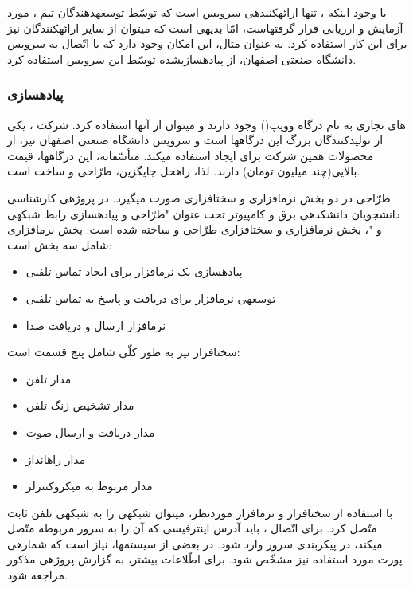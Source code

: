 با وجود اینکه ، تنها ارائه\nf کننده\nf ی سرویس  است که توسّط توسعه\nf دهندگان تیم ، مورد آزمایش و ارزیابی قرار گرفته\nf است، امّا بدیهی است که می\nf توان از سایر ارائه\nf کنندگان نیز برای این کار استفاده کرد. به عنوان مثال، این امکان وجود دارد که با اتّصال  به سرویس  دانشگاه صنعتی اصفهان، از  پیاده\nf سازی\nf شده توسّط این سرویس استفاده کرد.

\subsubsection{پیادهسازی } 
های تجاری به نام درگاه وویپ() وجود دارند و می\nf توان از آن\nf ها استفاده کرد. شرکت ، یکی از تولیدکنندگان بزرگ این درگاه\nf ها است و سرویس   دانشگاه صنعتی اصفهان نیز، از محصولات همین شرکت برای ایجاد  استفاده می\nf کند. متأسّفانه، این درگاه\nf ها، قیمت بالایی(چند میلیون تومان) دارند. لذا، راه\nf حل جایگزین، طرّاحی و ساخت  است.  

طرّاحی  در دو بخش نرم\nf افزاری و سخت\nf افزاری صورت می\nf گیرد. در پروژه\nf ی کارشناسی دانشجویان دانشکده\nf ی برق و کامپیوتر تحت عنوان "طرّاحی و پیاده\nf سازی رابط شبکه\nf ی  و "، بخش نرم\nf افزاری و سخت\nf افزاری  طرّاحی و ساخته شده است. بخش نرم\nf افزاری شامل سه بخش است:
\begin{itemize}
\item پیاده\nf سازی یک نرم\nf افزار برای ایجاد تماس تلفنی
\item توسعه\nf ی نرم\nf افزار برای دریافت و پاسخ به تماس تلفنی
\item نرم\nf افزار ارسال و دریافت صدا
\end{itemize}
 سخت\nf افزار  نیز به طور کلّی شامل پنج قسمت است:
 \begin{itemize}
 \item مدار   تلفن
 \item مدار تشخیص زنگ تلفن
 \item مدار دریافت و ارسال صوت
 \item مدار راه\nf انداز 
 \item مدار مربوط به میکروکنترلر
 \end{itemize}
 با استفاده از سخت\nf افزار و نرم\nf افزار موردنظر، می\nf توان شبکه\nf ی  را به شبکه\nf ی تلفن ثابت متّصل کرد. برای اتّصال ، باید آدرس  اینترفیسی که آن را به سرور مربوطه متّصل می\nf کند، در پیکربندی سرور وارد شود. در بعضی از سیستم\nf ها، نیاز است که شماره\nf ی پورت مورد استفاده نیز مشخّص شود. برای اطّلاعات بیشتر، به گزارش پروژه\nf ی مذکور مراجعه شود.

